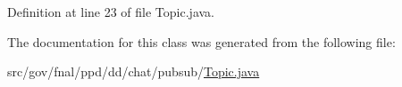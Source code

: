 Definition at line 23 of file Topic.\-java.



The documentation for this class was generated from the following file\-:\begin{DoxyCompactItemize}
\item 
src/gov/fnal/ppd/dd/chat/pubsub/\hyperlink{Topic_8java}{Topic.\-java}\end{DoxyCompactItemize}
